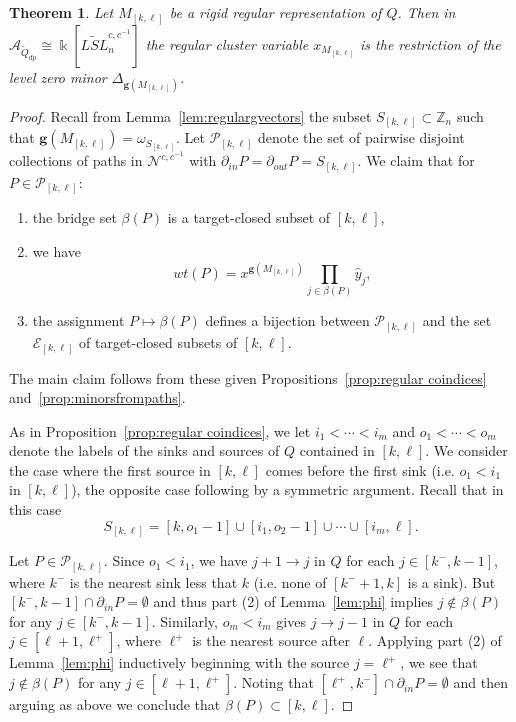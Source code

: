 \documentclass[12pt]{amsart}
\newcommand{\cA}{\mathcal{A}}
\newcommand{\ZZ}{\mathbb{Z}}
\newcommand{\kk}{\Bbbk}
\newcommand{\bfg}{\mathbf{g}}
\newcommand{\grep}{\bfg}
\newcommand{\cE}{\mathcal{E}}
\newcommand{\cN}{\mathcal{N}} %
\newcommand{\cP}{\mathcal{P}}
\newcommand{\Qdp}{\widetilde{Q}_{dp}}
\newcommand{\Qrep}{M}
\newtheorem{theorem}{Theorem}[section]
\theoremstyle{remark}
\numberwithin{equation}{section}
\numberwithin{figure}{section}
\begin{document}
\begin{theorem}\label{th:cluster character equals minor}
  Let $\Qrep_{[k,\ell]}$ be a rigid regular representation of $Q$.
  Then in $\cA_{\Qdp} \cong \kk[\widetilde{LSL}_n^{c,c^{-1}}]$ the regular cluster variable $x_{\Qrep_{[k,\ell]}}$ is the restriction of the level zero minor $\Delta_{\grep(\Qrep_{[k,\ell]})}$.
\end{theorem}
\begin{proof}
  Recall from Lemma~\ref{lem:regulargvectors} the subset $S_{[k,\ell]} \subset \ZZ_n$ such that $\grep(\Qrep_{[k,\ell]}) = \omega_{S_{[k,\ell]}}$.
  Let $\cP_{[k,\ell]}$ denote the set of pairwise disjoint collections of paths in $\cN^{c,c^{-1}}$ with $\partial_{in}P = \partial_{out}P = S_{[k,\ell]}$.
  We claim that for $P \in \cP_{[k,\ell]}$: 
  \begin{enumerate}
    \item 
      the bridge set $\beta(P)$ is a target-closed subset of $[k,\ell]$, 
    \item 
      we have
      \[
        wt(P) = x^{\grep(\Qrep_{[k,\ell]})} \prod_{j \in \beta(P)} \hat{y}_j,
      \]
    \item 
      the assignment $P \mapsto \beta(P)$ defines a bijection between $\cP_{[k,\ell]}$ and the set $\cE_{[k,\ell]}$ of target-closed subsets of $[k,\ell]$.
  \end{enumerate}
  The main claim follows from these given Propositions~\ref{prop:regular coindices} and~\ref{prop:minorsfrompaths}.
  
  As in Proposition~\ref{prop:regular coindices}, we let $i_1 < \cdots < i_m$ and $o_1 < \cdots < o_m$ denote the labels of the sinks and sources of $Q$ contained in $[k,\ell]$.
  We consider the case where the first source in $[k,\ell]$ comes before the first sink (i.e. $o_1 < i_1$ in $[k,\ell]$), the opposite case following by a symmetric argument.
  Recall that in this case
  \[
    S_{[k,\ell]} = [k,o_1-1] \cup [i_1,o_2-1] \cup \cdots \cup [i_m,\ell].
  \]
  
  Let $P \in \cP_{[k,\ell]}$.
  Since $o_1<i_1$, we have $j+1\to j$ in $Q$ for each $j\in[k^-,k-1]$, where $k^-$ is the nearest sink less that $k$ (i.e. none of $[k^-+1,k]$ is a sink).
  But $[k^-,k-1]\cap\partial_{in}P=\emptyset$ and thus part (2) of Lemma~\ref{lem:phi} implies $j\notin\beta(P)$ for any $j\in[k^-,k-1]$.
  Similarly, $o_m<i_m$ gives $j\to j-1$ in $Q$ for each $j\in[\ell+1,\ell^+]$, where $\ell^+$ is the nearest source after $\ell$.
  Applying part (2) of Lemma~\ref{lem:phi} inductively beginning with the source $j=\ell^+$, we see that $j\notin\beta(P)$ for any $j\in[\ell+1,\ell^+]$.
  Noting that $[\ell^+,k^-]\cap\partial_{in}P=\emptyset$ and then arguing as above we conclude that $\beta(P)\subset[k,\ell]$.
  

\end{proof}
\end{document}
